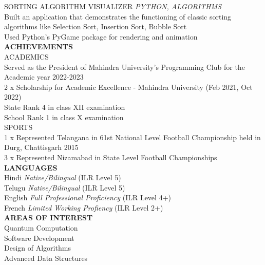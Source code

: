 \documentclass[a4paper, oneside, 12pt]{article}
\begin{document}
\begin{Parallel}{0.39\textwidth}{0.58\textwidth}
{		\noindent
		\textsf{\textmd{SORTING ALGORITHM VISUALIZER} \hfill \textsl{PYTHON, ALGORITHMS}} \\
		\textbullet \textsf{Built an application that demonstrates the functioning of classic sorting algorithms like Selection Sort, Insertion Sort, Bubble Sort} \\
		\textbullet \textsf{Used Python's PyGame package for rendering and animation} \\
		    
		\noindent
		\textsf{{\large \textbf{ACHIEVEMENTS}}} \\
		\textsf{\textmd{ACADEMICS}} \\
		\textsf{Served as the President of Mahindra University's Programming Club for the Academic year 2022-2023} \\
		\textsf{2 x Scholarship for Academic Excellence - Mahindra University (Feb 2021, Oct 2022)} \\
		\textsf{State Rank 4 in class XII examination} \\
		\textsf{School Rank 1 in class X examination} \\
		
		\noindent
		\textsf{\textmd{SPORTS}} \\
		\textsf{1 x Represented Telangana in 61st National Level Football Championship held in Durg, Chattisgarh 2015 \\
			3 x Represented Nizamabad in State Level Football Championships} \\
		
		\noindent
		\textsf{{\large \textbf{LANGUAGES}}} \\
		\textsf{Hindi} \textsf{\textit{Native/Bilingual}} \textsf{(ILR Level 5)} \\
		\textsf{Telugu} \textsf{\textit{Native/Bilingual}} \textsf{(ILR Level 5)} \\
		\textsf{English} \textsf{\textit{Full Professional Proficiency}} \textsf{(ILR Level 4+)} \\
		\textsf{French} \textsf{\textit{Limited Working Profiency}} \textsf{(ILR Level 2+)} \\
		
		\noindent
		\textsf{{\large \textbf{AREAS OF INTEREST}}} \\
		\textsf{Quantum Computation} \\
		\textsf{Software Development} \\
		\textsf{Design of Algorithms} \\
		\textsf{Advanced Data Structures} \\
	} 
	    
\end{Parallel}
\end{document}
